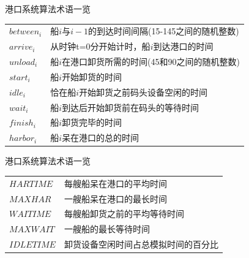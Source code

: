 \documentclass[UTF8]{ctexbeamer}
\begin{document}
\begin{frame}{港口系统算法术语一览}

  \begin{table}
    \centering
    \begin{tabular}{ll}
      $between_i$ & 船$i$与$i-1$的到达时间间隔(15-145之间的随机整数)\\
      $arrive_i$  & 从时钟t=0分开始计时，船$i$到达港口的时间\\
      $unload_i$  &  船$i$在港口卸货所需的时间(45和90之间的随机整数)\\
      $start_i$    &  船$i$开始卸货的时间\\
      $idle_i$     &  恰在船$i$开始卸货之前码头设备空闲的时间\\
      $wait_i$     &  船$i$到达后开始卸货前在码头的等待时间\\
      $finish_i$   &   船$i$卸货完毕的时间\\
      $harbor_i$   &  船$i$呆在港口的总的时间\\
    \end{tabular}
  \end{table}
\end{frame}

\begin{frame}{港口系统算法术语一览}

  \begin{table}
    \centering
    \begin{tabular}{ll}
      $HARTIME$ & 每艘船呆在港口的平均时间\\
      $MAXHAR$ & 一艘船呆在港口的最长时间\\
      $WAITIME$ &  每艘船卸货之前的平均等待时间\\
      $MAXWAIT$ & 一艘船的最长等待时间\\
      $IDLETIME$ &  卸货设备空闲时间占总模拟时间的百分比
    \end{tabular}
  \end{table}
\end{frame}
    
\end{document}
